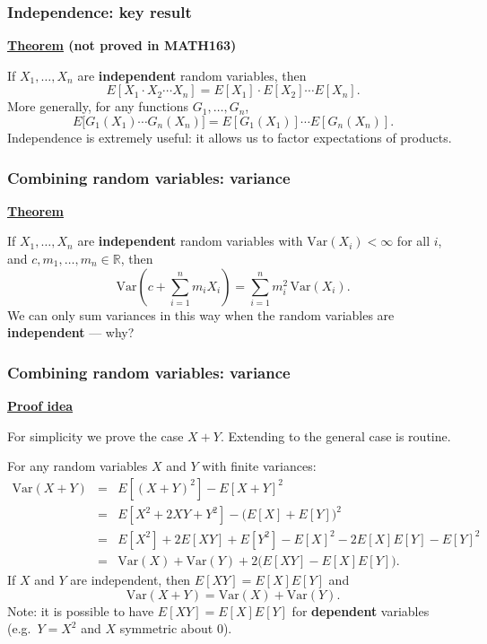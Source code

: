 \documentclass[t,8pt]{beamer}
\begin{document}
\begin{frame}
	\frametitle{Independence: key result}
	{\bf\underline{Theorem} (not proved in MATH163)} \par
	If $X_1,\dots,X_n$ are {\bf independent} random variables, then
	\[
	E[X_1\cdot X_2\cdots X_n]
	=E[X_1]\cdot E[X_2]\cdots E[X_n].
	\]
	More generally, for any functions $G_1,\dots,G_n$,
	\[
	E\big[G_1(X_1)\cdots G_n(X_n)\big]
	=E[G_1(X_1)]\cdots E[G_n(X_n)].
	\]
	{\small\color{NavyBlue} Independence is extremely useful: it allows us to factor expectations of products.}
\end{frame}

\begin{frame}
	\frametitle{Combining random variables: variance}
	{\bf\underline{Theorem}} \par
	If $X_1,\dots,X_n$ are {\bf independent} random variables with $\mathrm{Var}(X_i)<\infty$ for all $i$, and $c,m_1,\dots,m_n\in\mathbb R$, then
	\[
	\mathrm{Var}\!\left(c+\sum_{i=1}^n m_i X_i\right)
	=\sum_{i=1}^n m_i^2\,\mathrm{Var}(X_i).
	\]
	We can only sum variances in this way when the random variables are {\bf independent} — why?
\end{frame}

\begin{frame}
	\frametitle{Combining random variables: variance}
	{\bf\underline{Proof idea}} \par
	For simplicity we prove the case $X+Y$. Extending to the general case is routine. \par
	For any random variables $X$ and $Y$ with finite variances:
	\begin{eqnarray*}
		\mathrm{Var}(X+Y)
		&=&E[(X+Y)^2]-E[X+Y]^2\\
		&=&E[X^2+2XY+Y^2]-\big(E[X]+E[Y]\big)^2\\
		&=&E[X^2]+2E[XY]+E[Y^2]
		-E[X]^2-2E[X]E[Y]-E[Y]^2\\
		&=&\mathrm{Var}(X)+\mathrm{Var}(Y)
		+2\big(E[XY]-E[X]E[Y]\big).
	\end{eqnarray*}
	If $X$ and $Y$ are independent, then $E[XY]=E[X]E[Y]$ and
	\[
	\mathrm{Var}(X+Y)=\mathrm{Var}(X)+\mathrm{Var}(Y).
	\]
	Note: it is possible to have $E[XY]=E[X]E[Y]$ for {\bf dependent} variables (e.g.\ $Y=X^2$ and $X$ symmetric about $0$).
\end{frame}
\end{document}
